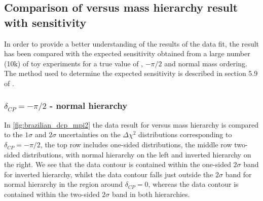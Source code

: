 



\subsection {Comparison of \deltacp versus mass hierarchy result with sensitivity}
\label{sec:results:brazilian}

In order to provide a better understanding of the results of the \RunPeriod data fit, the result has been compared with the expected sensitivity obtained from a large number (10k) of toy experiments for a true value of \deltacp, $-\pi/2$ and normal mass ordering. The method used to determine the expected sensitivity is described in section 5.9 of \cite{OurRun18JointAnalysis3Flavour}.

\subsubsection{$\delta_{CP} = -\pi/2$ - normal hierarchy}

In \cref{fig:brazilian_dcp_mpi2} the \RunPeriod data result for \deltacp versus mass hierarchy is compared to the $1\sigma$ and $2\sigma$ uncertainties on the $\Delta\chi^2$ distributions corresponding to $\delta_{CP} = -\pi/2$, the top row includes one-sided distributions, the middle row two-sided distributions, with normal hierarchy on the left and inverted hierarchy on the right. We see that the data contour is contained within the one-sided $2\sigma$ band for inverted hierarchy, whilst the data contour falls just outside the $2\sigma$ band for normal hierarchy in the region around $\delta_{CP} = 0$, whereas the data contour is contained within the two-sided $2\sigma$ band in both hierarchies.

